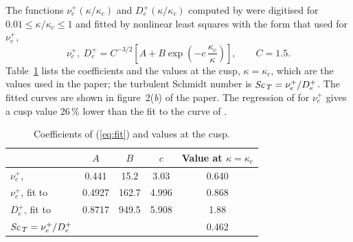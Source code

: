 \documentclass[11pt]{article}
\newcommand{\Sct}{\mbox{\textit{Sc}}_{\, T}}
\newcommand{\De}{D_e^{+}}
\begin{document}
The functions $\nu_e^{+}(\kappa / \kappa_c)$ and $\De(\kappa / \kappa_c)$ computed by \citet{Chollet1984} were digitised for $0.01 \leqslant \kappa / \kappa_c \leqslant 1$ and fitted by nonlinear least squares with the form that \citet{Pope2000} used for $\nu_e^{+}$,
\begin{equation}
  \nu_e^{+}, \ \De = C^{-3/2} \left[A + B \exp\left(-c \, \frac{\kappa_c}{\kappa}\right)\right], \qquad C = 1.5.
  \label{eq:fit}
\end{equation}
Table~\ref{tab:fit} lists the coefficients and the values at the cusp, $\kappa = \kappa_c$, which are the values used in the paper; the turbulent Schmidt number is $\Sct = \nu_e^{+} / \De$. The fitted curves are shown in figure~2(\textit{b}) of the paper. The regression of \citet{Pope2000} for $\nu_e^{+}$ gives a cusp value 26\,\% lower than the fit to the curve of \citet{Chollet1984}.
\begin{table}[h!]
  \centering
  \begin{tabular}{lcccc}
    \toprule
                                             & $A$    & $B$   & $c$   & Value at $\kappa = \kappa_c$ \\
    \midrule
    $\nu_e^{+}$, \citet{Pope2000}            & 0.441  & 15.2  & 3.03  & 0.640 \\
    $\nu_e^{+}$, fit to \citet{Chollet1984}  & 0.4927 & 162.7 & 4.996 & 0.868 \\
    $\De$, fit to \citet{Chollet1984}        & 0.8717 & 949.5 & 5.908 & 1.88  \\
    $\Sct = \nu_e^{+} / \De$                 &        &       &       & 0.462 \\
    \bottomrule
  \end{tabular}
  \caption{Coefficients of (\ref{eq:fit}) and values at the cusp.}
  \label{tab:fit}
\end{table}



\end{document}
